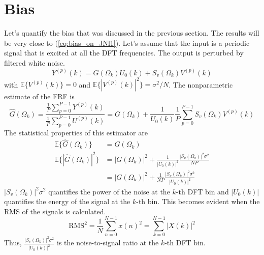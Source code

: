 \section{Bias}
\label{sec:bias}
Let's quantify the bias that was discussed in the previous section. The results will be very close to (\ref{eq:bias_on_JNl1}). Let's assume that the input is a periodic signal that is excited at all the DFT frequencies. The output is perturbed by filtered white noise.
\begin{equation*}
    Y^{(p)}(k) = G(\Omega_k)U_0(k) + S_v(\Omega_k) V^{(p)}(k)
\end{equation*}
with $\mathbb{E}\{V^{(p)}(k)\} = 0$ and $\mathbb{E}\{|V^{(p)}(k)|^2\} = \sigma^2/N$. The nonparametric estimate of the FRF is
\begin{equation*}
    \hat G(\Omega_k) = \frac{\frac{1}{P}\sum_{p=0}^{P-1}  Y^{(p)}(k)}{\frac{1}{P}\sum_{p=0}^{P-1}  U^{(p)}(k)} = G(\Omega_k) + \frac{1}{U_0(k)} \frac{1}{P}\sum_{p=0}^{P-1} S_v(\Omega_k) V^{(p)}(k)
\end{equation*}
The statistical properties of this estimator are
\begin{align*}
    \mathbb{E}\{\hat G(\Omega_k)\} &= G(\Omega_k)\\
    \mathbb{E}\{|\hat G(\Omega_k)|^2\} &= |G(\Omega_k)|^2 + \frac{1}{|U_0(k)|^2}\frac{|S_v(\Omega_k)|^2 \sigma^2}{NP}\\
    &= |G(\Omega_k)|^2 + \frac{1}{N\!P}\frac{|S_v(\Omega_k)|^2 \sigma^2}{|U_0(k)|^2}
\end{align*}
$|S_v(\Omega_k)|^2 \sigma^2$ quantifies the power of the noise at the $k$-th DFT bin and $|U_0(k)|$ quantifies the energy of the signal at the $k$-th bin. This becomes evident when the RMS of the signals is calculated.
\begin{equation*}
    \text{RMS}^2 = \frac{1}{N}\sum_{n=0}^{N-1} x(n)^2 = \sum_{k=0}^{N-1} |X(k)|^2
\end{equation*}
Thus, $\frac{|S_v(\Omega_k)|^2 \sigma^2}{|U_0(k)|^2}$ is the noise-to-signal ratio at the $k$-th DFT bin.

